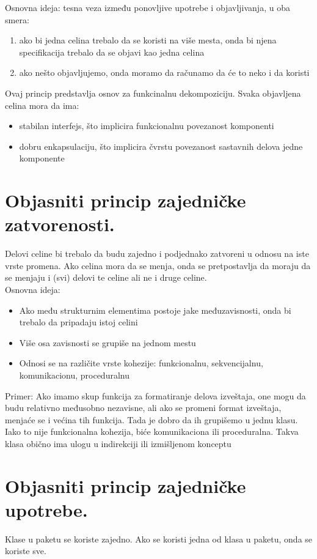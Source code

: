 \documentclass[a4paper]{article}
\begin{document}
Osnovna ideja: tesna veza između ponovljive upotrebe i objavljivanja, u oba smera:
\begin{enumerate}
      \item ako bi jedna celina trebalo da se koristi na više mesta, onda bi njena specifikacija trebalo da se objavi kao jedna celina
      \item ako nešto objavljujemo, onda moramo da računamo da će to neko i da koristi
\end{enumerate}

Ovaj princip predstavlja osnov za funkcinalnu dekompoziciju. Svaka objavljena celina mora da ima:
\begin{itemize}
    \item stabilan interfejs, što implicira funkcionalnu povezanost komponenti
    \item dobru enkapsulaciju, što implicira čvrstu povezanost sastavnih delova jedne komponente
\end{itemize}


\section{Objasniti princip zajedničke zatvorenosti.}
Delovi celine bi trebalo da budu zajedno i podjednako zatvoreni u odnosu na iste vrste promena. Ako celina mora da se menja, onda se pretpostavlja da moraju da se menjaju i (svi) delovi te celine ali ne i druge celine.\\

Osnovna ideja:
\begin{itemize}
   \item Ako među strukturnim elementima postoje jake međuzavisnosti, onda bi trebalo da pripadaju istoj celini
   \item Više osa zavisnosti se grupiše na jednom mestu
   \item Odnosi se na različite vrste kohezije: funkcionalnu, sekvencijalnu, komunikacionu, proceduralnu\\
\end{itemize}

Primer:
   Ako imamo skup funkcija za formatiranje delova izveštaja, one mogu da budu relativno međusobno nezavisne, ali ako se promeni format izveštaja, menjaće se i većina tih funkcija. Tada je dobro da ih grupišemo u jednu klasu. Iako to nije funkcionalna kohezija, biće komunikaciona ili proceduralna. Takva klasa obično ima ulogu u indirekciji ili izmišljenom konceptu

\section{Objasniti princip zajedničke upotrebe.}
Klase u paketu se koriste zajedno. Ako se koristi jedna od klasa u paketu, onda se koriste sve.\\
\end{document}
